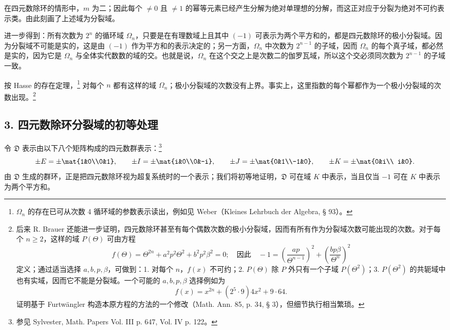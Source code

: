在四元数除环的情形中，$m$ 为二；因此每个 $\ne0$ 且 $\ne1$ 的幂等元素已经产生分解为绝对单理想的分解，而这正对应于分裂为绝对不可约表示类。由此刻画了上述域为分裂域。

进一步得到：所有次数为 $2^n$ 的循环域 $\Omega_n$，只要是在有理数域上且其中 $(-1)$ 可表示为两个平方和的，都是四元数除环的极小分裂域。因为分裂域不可能是实的，这是由 $(-1)$ 作为平方和的表示决定的；另一方面，$\Omega_n$ 中次数为 $2^{n-1}$ 的子域，因而 $\Omega_n$ 的每个真子域，都必然是实的，因为它是 $\Omega_n$ 与全体实代数数的域的交。也就是说，$\Omega_n$ 在这个交之上是次数二的伽罗瓦域，所以这个交必须同次数为 $2^{n-1}$ 的子域一致。

按 Hasse 的存在定理，\footnote{$\Omega_n$ 的存在已可从次数 4 循环域的参数表示读出，例如见 Weber（Kleines Lehrbuch der Algebra, § 93）。} 对每个 $n$ 都有这样的域 $\Omega_n$；极小分裂域的次数没有上界。事实上，这里指数的每个幂都作为一个极小分裂域的次数出现。\footnote{后来 R. Brauer 还能进一步证明，四元数除环甚至有每个偶数次数的极小分裂域，因而有所有作为分裂域次数可能出现的次数。对于每个 $n\ge2$，这样的域 $P(\Theta)$ 可由方程
\[
 f(\Theta)=\Theta^{2n}+a^2p^2\Theta^2+b^2p^2\beta^2=0;
 \quad \text{因此}\quad -1=\left(\frac{ap}{\Theta^{n-1}}\right)^2+
       \left(\frac{bp\beta}{\Theta^n}\right)^2
\]
定义；通过适当选择 $a,b,p,\beta$，可做到：1. 对每个 $n$，$f(x)$ 不可约；2. $P(\Theta)$ 除 $P$ 外只有一个子域 $P(\Theta^2)$；3. $P(\Theta^2)$ 的共轭域中也有实域，因而它不能是分裂域。一个可能的 $a,b,p,\beta$ 选择例如为
\[
        f(x)=x^{2n}+(2^5\cdot9)4x^2+9\cdot64.
\]
证明基于 Furtwängler 构造本原方程的方法的一个修改（Math. Ann. 85, p. 34, § 3），但细节执行相当繁琐。}

\subsection*{3. 四元数除环分裂域的初等处理}

令 $\mathfrak{D}$ 表示由以下八个矩阵构成的四元数群表示：\footnote{参见 Sylvester, Math. Papers Vol. III p. 647, Vol. IV p. 122。}
\[
\pm E=\pm\mat{1&0\\0&1},\qquad
\pm I=\pm\mat{i&0\\0&-i},\qquad
\pm J=\pm\mat{0&1\\-1&0},\qquad
\pm K=\pm\mat{0&i\\ i&0}.
\]
由 $\mathfrak{D}$ 生成的群环，正是把四元数除环视为超复系统时的一个表示；我们将初等地证明，$\mathfrak{D}$ 可在域 $K$ 中表示，当且仅当 $-1$ 可在 $K$ 中表示为两个平方和。

